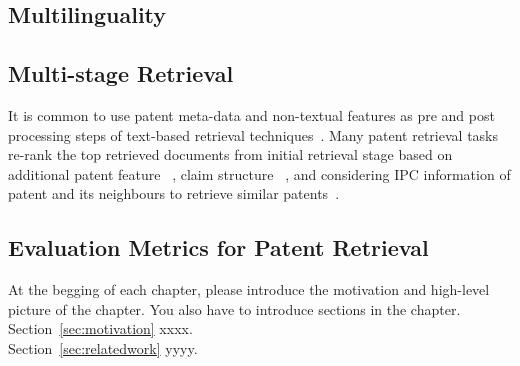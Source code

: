 \subsection{Multilinguality}
%

\subsection{Multi-stage Retrieval}
It is common to use patent meta-data and non-textual features as pre and post processing steps of text-based retrieval techniques~\citep{lopez2009multiple}. Many patent retrieval tasks re-rank the top retrieved documents from initial retrieval stage based on additional patent feature ~\citep{lopez2010experiments}, claim structure ~\citep{mase2005proposal}, and considering IPC information of patent and its neighbours to retrieve similar patents~\citep{verma2011exploring}. 

\subsection{Evaluation Metrics for Patent Retrieval}
%












































At the begging of each chapter, please introduce the motivation and high-level
picture of the chapter. You also have to introduce sections in the
chapter. \\


Section~\ref{sec:motivation} xxxx.\\


Section~\ref{sec:relatedwork} yyyy.\\


